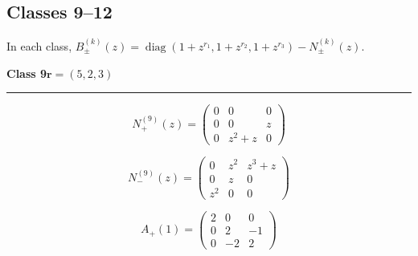 \subsection*{Classes 9--12}
\noindent In each class, $B_\pm^{(k)}(z)=\operatorname{diag}(1+z^{r_1},1+z^{r_2},1+z^{r_3})-N_\pm^{(k)}(z)$.\par\medskip
\noindent\begin{minipage}{\linewidth}
\noindent\textbf{Class 9}\hfill $\symbf{r}=(5,2,3)$
\par\smallskip\noindent\textcolor{rulegray}{\rule{\linewidth}{0.3pt}}
\begin{minipage}[c]{0.495\linewidth}\centering\fontsize{10.5}{13}\selectfont
\setlength{\abovedisplayskip}{3pt}\setlength{\belowdisplayskip}{3pt}
\setlength{\abovedisplayshortskip}{3pt}\setlength{\belowdisplayshortskip}{3pt}
\setlength{\arraycolsep}{3.5pt}\renewcommand{\arraystretch}{1.18}
\[N_{+}^{(9)}(z)=\begin{pmatrix}0 & 0 & 0\\0 & 0 & z\\0 & z^{2} + z & 0\end{pmatrix}\]
\end{minipage}%
\begin{minipage}[c]{0.495\linewidth}\centering\fontsize{10.5}{13}\selectfont
\setlength{\abovedisplayskip}{3pt}\setlength{\belowdisplayskip}{3pt}
\setlength{\abovedisplayshortskip}{3pt}\setlength{\belowdisplayshortskip}{3pt}
\setlength{\arraycolsep}{3.5pt}\renewcommand{\arraystretch}{1.18}
\[N_{-}^{(9)}(z)=\begin{pmatrix}0 & z^{2} & z^{3} + z\\0 & z & 0\\z^{2} & 0 & 0\end{pmatrix}\]
\end{minipage}%
\par\noindent
\begin{minipage}[c]{0.495\linewidth}\centering\fontsize{10.5}{13}\selectfont
\setlength{\abovedisplayskip}{3pt}\setlength{\belowdisplayskip}{3pt}
\setlength{\abovedisplayshortskip}{3pt}\setlength{\belowdisplayshortskip}{3pt}
\setlength{\arraycolsep}{3.5pt}\renewcommand{\arraystretch}{1.18}
\[A_{+}(1)=\begin{pmatrix}2 & 0 & 0\\0 & 2 & -1\\0 & -2 & 2\end{pmatrix}\]
\end{minipage}%
\begin{minipage}[c]{0.495\linewidth}\centering\fontsize{10.5}{13}\selectfont

\end{minipage}
\end{minipage}
